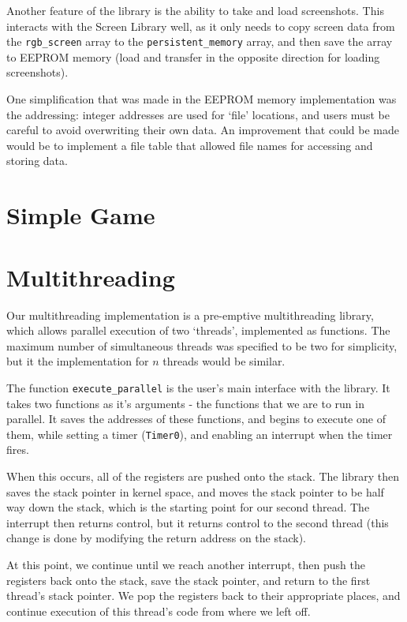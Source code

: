 \documentclass[a4paper,10pt]{article}
\begin{document}
Another feature of the library is the ability to take and load screenshots.
This interacts with the Screen Library well, as it only needs to copy screen
data from the \texttt{rgb\_screen} array to the \texttt{persistent\_memory}
array, and then save the array to EEPROM memory (load and transfer in the
opposite direction for loading screenshots).

One simplification that was made in the EEPROM memory implementation was the
addressing: integer addresses are used for `file' locations, and users must
be careful to avoid overwriting their own data. An improvement that could be
made would be to implement a file table that allowed file names for accessing
and storing data.

\section*{Simple Game}

\section*{Multithreading}

Our multithreading implementation is a pre-emptive multithreading library,
which allows parallel execution of two `threads', implemented as functions.
The maximum number of simultaneous threads was specified to be two for
simplicity, but it the implementation for $n$ threads would be similar.

The function \texttt{execute\_parallel} is the user's main interface with the
library. It takes two functions as it's arguments - the functions that we are
to run in parallel. It saves the addresses of these functions, and begins to
execute one of them, while setting a timer (\texttt{Timer0}), and enabling an
interrupt when the timer fires.

When this occurs, all of the registers are pushed onto the stack. The library
then saves the stack pointer in kernel space, and moves the stack pointer to
be half way down the stack, which is the starting point for our second thread.
The interrupt then returns control, but it returns control to the second
thread (this change is done by modifying the return address on the stack).

At this point, we continue until we reach another interrupt, then push the
registers back onto the stack, save the stack pointer, and return to the first
thread's stack pointer. We pop the registers back to their appropriate places,
and continue execution of this thread's code from where we left off.
\end{document}

